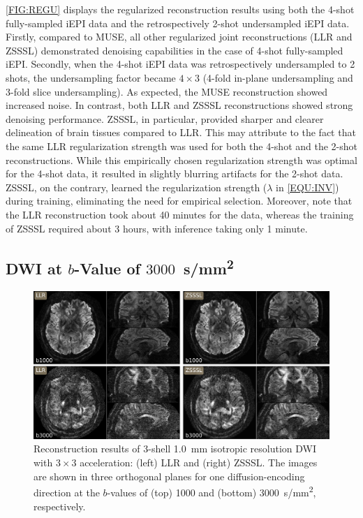 \documentclass[journal,twoside,web]{ieeecolor}
\begin{document}
	\cref{FIG:REGU} displays the regularized reconstruction results
	using both the 4-shot fully-sampled iEPI data and
	the retrospectively 2-shot undersampled iEPI data.
	Firstly, compared to MUSE, all other regularized joint reconstructions (LLR and ZSSSL)
	demonstrated denoising capabilities in the case of 4-shot fully-sampled iEPI.
	Secondly, when the 4-shot iEPI data was retrospectively undersampled to 2 shots,
	the undersampling factor became $4 \times 3$
	(4-fold in-plane undersampling and 3-fold slice undersampling).
	As expected, the MUSE reconstruction showed increased noise.
	In contrast, both LLR and ZSSSL reconstructions showed strong denoising performance.
	ZSSSL, in particular, provided sharper and clearer delineation
	of brain tissues compared to LLR.
	This may attribute to the fact that the same LLR regularization strength was used
	for both the 4-shot and the 2-shot reconstructions.
	While this empirically chosen regularization strength was optimal for the 4-shot data,
	it resulted in slightly blurring artifacts for the 2-shot data.
	ZSSSL, on the contrary, learned the regularization strength
	($\lambda$ in \cref{EQU:INV}) during training,
	eliminating the need for empirical selection.
	Moreover, note that the LLR reconstruction took about 40 minutes for the data,
	whereas the training of ZSSSL required about 3 hours,
	with inference taking only 1 minute.


	\subsection{DWI at $b$-Value of $3000$~\si{s/mm^2}}

	\begin{figure}
		\centering
		\includegraphics[width=\textwidth]{../figures/fig3.png}
		\caption{Reconstruction results of 3-shell \SI{1.0}{mm} isotropic resolution
		DWI with $3 \times 3$ acceleration: (left) LLR and (right) ZSSSL.
		The images are shown in three orthogonal planes for
		one diffusion-encoding direction at the $b$-values of
		(top) 1000 and (bottom) \SI{3000}{s/mm^2}, respectively.}
		\label{FIG:B3000}
	\end{figure}
\end{document}
